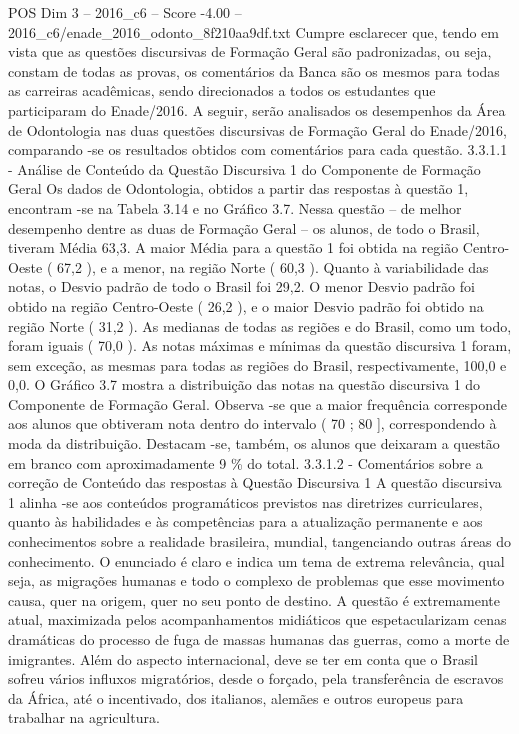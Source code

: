 \begin{textsample}{POS Dim 3 – 2016\_c6 – Score -4.00 – 2016\_c6/enade\_2016\_odonto\_8f210aa9df.txt}
Cumpre esclarecer que, tendo em vista que as questões discursivas de Formação Geral são padronizadas, ou seja, constam de todas as provas, os comentários da Banca são os mesmos para todas as carreiras acadêmicas, sendo direcionados a todos os estudantes que participaram do Enade/2016.
A seguir, serão analisados os desempenhos da Área de Odontologia nas duas questões discursivas de Formação Geral do Enade/2016, comparando -se os resultados obtidos com comentários para cada questão. 3.3.1.1 - Análise de Conteúdo da Questão Discursiva 1 do Componente de Formação Geral Os dados de Odontologia, obtidos a partir das respostas à questão 1, encontram -se na Tabela 3.14 e no Gráfico 3.7.
Nessa questão – de melhor desempenho dentre as duas de Formação Geral – os alunos, de todo o Brasil, tiveram Média 63,3.
A maior Média para a questão 1 foi obtida na região Centro-Oeste ( 67,2 ), e a menor, na região Norte ( 60,3 ).
Quanto à variabilidade das notas, o Desvio padrão de todo o Brasil foi 29,2.
O menor Desvio padrão foi obtido na região Centro-Oeste ( 26,2 ), e o maior Desvio padrão foi obtido na região Norte ( 31,2 ).
As medianas de todas as regiões e do Brasil, como um todo, foram iguais ( 70,0 ).
As notas máximas e mínimas da questão discursiva 1 foram, sem exceção, as mesmas para todas as regiões do Brasil, respectivamente, 100,0 e 0,0.
O Gráfico 3.7 mostra a distribuição das notas na questão discursiva 1 do Componente de Formação Geral.
Observa -se que a maior frequência corresponde aos alunos que obtiveram nota dentro do intervalo ( 70 ; 80 ], correspondendo à moda da distribuição.
Destacam -se, também, os alunos que deixaram a questão em branco com aproximadamente 9 \% do total. 3.3.1.2 - Comentários sobre a correção de Conteúdo das respostas à Questão Discursiva 1 A questão discursiva 1 alinha -se aos conteúdos programáticos previstos nas diretrizes curriculares, quanto às habilidades e às competências para a atualização permanente e aos conhecimentos sobre a realidade brasileira, mundial, tangenciando outras áreas do conhecimento.
O enunciado é claro e indica um tema de extrema relevância, qual seja, as migrações humanas e todo o complexo de problemas que esse movimento causa, quer na origem, quer no seu ponto de destino.
A questão é extremamente atual, maximizada pelos acompanhamentos midiáticos que espetacularizam cenas dramáticas do processo de fuga de massas humanas das guerras, como a morte de imigrantes.
Além do aspecto internacional, deve se ter em conta que o Brasil sofreu vários influxos migratórios, desde o forçado, pela transferência de escravos da África, até o incentivado, dos italianos, alemães e outros europeus para trabalhar na agricultura.

\end{textsample}
